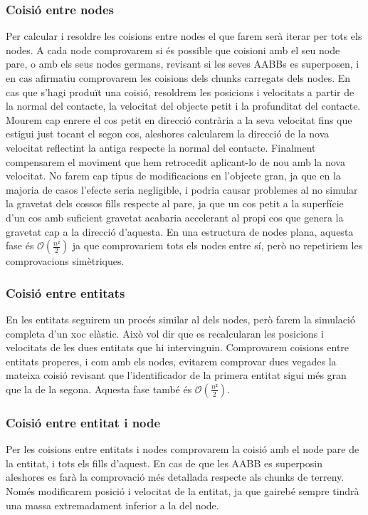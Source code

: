\subsubsection{Co\lgem isió entre nodes}
Per calcular i resoldre les co\lgem isions entre nodes el que farem serà iterar per tots els nodes. A cada node comprovarem si és possible que co\lgem isioni amb el seu node pare, o amb els seus nodes germans, revisant si les seves AABBs es superposen, i en cas afirmatiu comprovarem les co\lgem isions dels chunks carregats dels nodes.
En cas que s'hagi produït una co\lgem isió, resoldrem les posicions i velocitats a partir de la normal del contacte, la velocitat del objecte petit i la profunditat del contacte. Mourem cap enrere el cos petit en direcció contrària a la seva velocitat fins que estigui just tocant el segon cos, aleshores calcularem la direcció de la nova velocitat reflectint la antiga respecte la normal del contacte. Finalment compensarem el moviment que hem retrocedit aplicant-lo de nou amb la nova velocitat.
No farem cap tipus de modificacions en l'objecte gran, ja que en la majoria de casos l'efecte seria negligible, i podria causar problemes al no simular la gravetat dels cossos fills respecte al pare, ja que un cos petit a la superfície d'un cos amb suficient gravetat acabaria accelerant al propi cos que genera la gravetat cap a la direcció d'aquesta.
En una estructura de nodes plana, aquesta fase és $\mathcal{O}(\frac{n²}{2})$ ja que comprovariem tots els nodes entre sí, però no repetiriem les comprovacions simètriques.
\subsubsection{Co\lgem isió entre entitats}
En les entitats seguirem un procés similar al dels nodes, però farem la simulació completa d'un xoc elàstic. Això vol dir que es recalcularan les posicions i velocitats de les dues entitats que hi intervinguin.
Comprovarem co\lgem isions entre entitats properes, i com amb els nodes, evitarem comprovar dues vegades la mateixa co\lgem isió revisant que l'identificador de la primera entitat sigui més gran que la de la segona.
Aquesta fase també és $\mathcal{O}(\frac{n²}{2})$.
\subsubsection{Co\lgem isió entre entitat i node}
Per les co\lgem isions entre entitats i nodes comprovarem la co\lgem isió amb el node pare de la entitat, i tots els fills d'aquest. En cas de que les AABB es superposin aleshores es farà la comprovació més detallada respecte als chunks de terreny. Només modificarem posició i velocitat de la entitat, ja que gairebé sempre tindrà una massa extremadament inferior a la del node.

